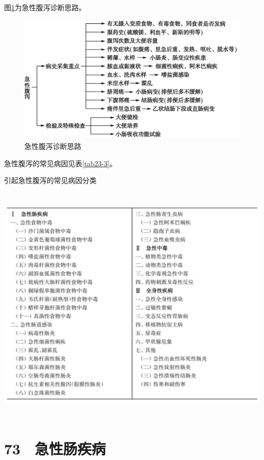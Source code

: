 图\ref{fig23-1}为急性腹泻诊断思路。

\begin{figure}[!htbp]
 \centering
 \includegraphics[width=4.44792in,height=2.44792in]{./images/Image00126.jpg}
 \captionsetup{justification=centering}
 \caption{急性腹泻诊断思路}
 \label{fig23-1}
  \end{figure} 

急性腹泻的常见病因见表\ref{tab23-3}。

\begin{table}[htbp]
\centering
\caption{引起急性腹泻的常见病因分类}
\label{tab23-3}
\includegraphics[width=5.94792in,height=4.58333in]{./images/Image00127.jpg}
\end{table}

\protect\hypertarget{text00183.html}{}{}

\section{73　急性肠疾病}

